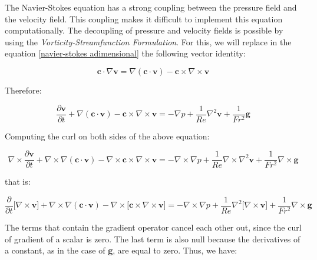 The Navier-Stokes equation has a strong coupling between
 the pressure field and the velocity field.
 This coupling makes it difficult to implement this
 equation computationally. The decoupling of pressure
 and velocity fields is possible by using the
 \textit{Vorticity-Streamfunction Formulation}.
 For this, we will replace in the equation
 \ref{navier-stokes adimensional} the following vector identity:

\begin{equation}
 \textbf{c} \cdot \nabla \textbf{v}
 = 
 \nabla \left( \textbf{c} \cdot \textbf{v} \right)
 - 
 \textbf{c} \times \nabla \times \textbf{v}
\end{equation}

\medskip
\noindent
Therefore:

\begin{equation}
 \frac{\partial \textbf{v}}{\partial t} 
 + 
 \nabla \left( \textbf{c} \cdot \textbf{v} \right)
 - 
 \textbf{c} \times \nabla \times \textbf{v}
 =
 -
 \nabla p
 +
 \frac{1}{Re} \nabla^{2} \textbf{v}
 +
 \frac{1}{Fr^{2}} \textbf{g}
\end{equation}

\medskip
\noindent
Computing the curl on both sides of the above equation:

\begin{equation}
 \nabla \times \frac{\partial \textbf{v}}{\partial t} 
 + 
 \nabla \times \nabla \left( \textbf{c} \cdot \textbf{v} \right)
 - 
 \nabla \times \textbf{c} \times \nabla \times \textbf{v}
 =
 -
 \nabla \times \nabla p
 +
 \frac{1}{Re} \nabla \times \nabla^{2} \textbf{v}
 +
 \frac{1}{Fr^{2}} \nabla \times \textbf{g}
\end{equation}

\medskip
\noindent
that is:

\begin{equation}
 \frac{\partial}{\partial t} \big[ \nabla \times \textbf{v} \big]
 + 
 \nabla \times \nabla \left( \textbf{c} \cdot \textbf{v} \right)
 - 
 \nabla \times \big[ \textbf{c} \times \nabla \times \textbf{v} \big]
 =
 -
 \nabla \times \nabla p
 +
 \frac{1}{Re} \nabla^{2} \big[ \nabla \times \textbf{v} \big]
 +
 \frac{1}{Fr^{2}} \nabla \times \textbf{g}
\end{equation}

\medskip
The terms that contain the gradient operator cancel
 each other out, since the curl of gradient of a scalar is zero.
 The last term is also null because the derivatives of a constant,
 as in the case of \textbf{g}, are equal to zero. Thus, we have:

